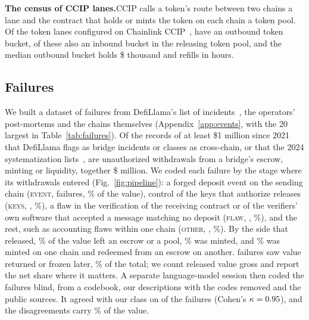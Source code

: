 \documentclass[conference,compsoc]{IEEEtran}
\numberwithin{equation}{section}
\theoremstyle{plain}
\theoremstyle{definition}
\theoremstyle{remark}
\newcommand{\runin}[1]{\par\smallskip\noindent\textbf{#1.}\enspace}
\newcommand{\cev}{\textsc{event}}
\newcommand{\ckeys}{\textsc{keys}}
\newcommand{\ccheck}{\textsc{flaw}}
\newcommand{\cother}{\textsc{other}}
\begin{document}


\runin{The census of CCIP lanes}CCIP calls a token's route between two chains a lane and the contract that holds or mints the token on each chain a token pool. Of the \ccipEntries{} token lanes configured on Chainlink CCIP~\cite{chainlink_lanes}, \ccipEnabled{} have an outbound token bucket, \ccipInEnabled{} of these also an inbound bucket in the releasing token pool, and the median outbound bucket holds \$\ccipMedCapK{} thousand and refills in \ccipMedRefillH{} hours.

\subsection{Failures}\label{sec:events}

We built a dataset of failures from DefiLlama's list of incidents~\cite{defillama_hacks}, the operators' post-mortems and the chains themselves (Appendix~\ref{app:events}, with the 20 largest in Table~\ref{tab:failures}). Of the \nRecords{} records of at least \$1 million since 2021 that DefiLlama flags as bridge incidents or classes as cross-chain, or that the 2024 systematization lists~\cite{augusto2024sok}, \nEvents{} are unauthorized withdrawals from a bridge's escrow, minting or liquidity, together \$ million. We coded each failure by the stage where its withdrawals entered (Fig.~\ref{fig:pipeline}): a forged deposit event on the sending chain (\cev{}, \nClassS{} failures, \classSPct\% of the value), control of the keys that authorize releases (\ckeys{}, \nClassV{}, \classVPct\%), a flaw in the verification of the receiving contract or of the verifiers' own software that accepted a message matching no deposit (\ccheck{}, \nClassD{}, \classDPct\%), and the rest, such as accounting flaws within one chain (\cother{}, \nClassO{}, \classOPct\%). By the side that released, \sideEscrowPct\% of the value left an escrow or a pool, \sideMintPct\% was minted, and \sideBothPct\% was minted on one chain and redeemed from an escrow on another. \nRecovered{} failures saw value returned or frozen later, \recoveredPct\% of the total; we count released value gross and report the net share where it matters. A separate language-model session then coded the failures blind, from a codebook, our descriptions with the codes removed and the public sources. It agreed with our class on \blindAgree{} of the \nEvents{} failures (Cohen's $\kappa = 0.95$), and the disagreements carry \blindDisValuePct\% of the value.
\end{document}
